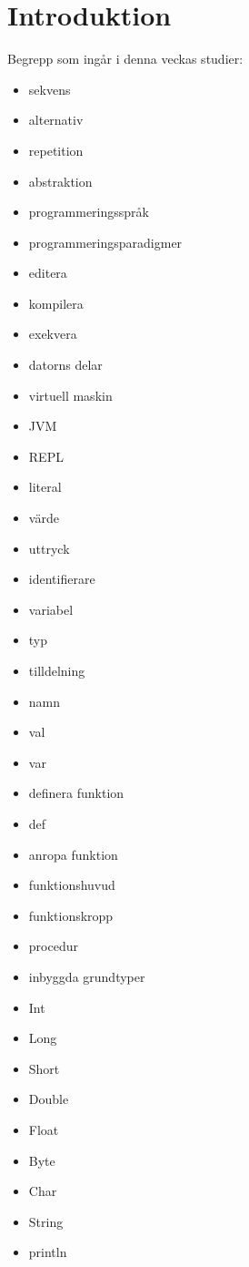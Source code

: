 \chapter{Introduktion}\label{chapter:W01}
Begrepp som ingår i denna veckas studier:
\begin{multicols}{2}\begin{itemize}[noitemsep,label={$\square$},leftmargin=*]
\item sekvens
\item alternativ
\item repetition
\item abstraktion
\item programmeringsspråk
\item programmeringsparadigmer
\item editera
\item kompilera
\item exekvera
\item datorns delar
\item virtuell maskin
\item JVM
\item REPL
\item literal
\item värde
\item uttryck
\item identifierare
\item variabel
\item typ
\item tilldelning
\item namn
\item val
\item var
\item definera funktion
\item def
\item anropa funktion
\item funktionshuvud
\item funktionskropp
\item procedur
\item inbyggda grundtyper
\item Int
\item Long
\item Short
\item Double
\item Float
\item Byte
\item Char
\item String
\item println

\end{itemize}
\end{multicols}
